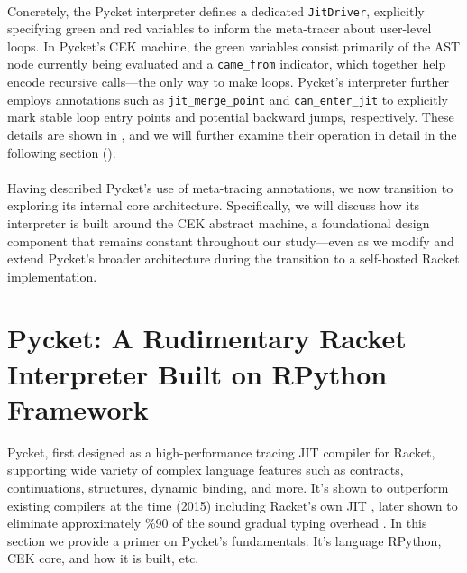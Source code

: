 
        \paragraph{}%
            Concretely, the Pycket interpreter defines a dedicated \texttt{JitDriver}, explicitly specifying green and red variables to inform the meta-tracer about user-level loops. In Pycket’s CEK machine, the green variables consist primarily of the AST node currently being evaluated and a \texttt{came\_from} indicator, which together help encode recursive calls—the only way to make loops. Pycket’s interpreter further employs annotations such as \texttt{jit\_merge\_point} and \texttt{can\_enter\_jit} to explicitly mark stable loop entry points and potential backward jumps, respectively. These details are shown in , and we will further examine their operation in detail in the following section ().

        \paragraph{}%
            Having described Pycket’s use of meta-tracing annotations, we now transition to exploring its internal core architecture. Specifically, we will discuss how its interpreter is built around the CEK abstract machine, a foundational design component that remains constant throughout our study—even as we modify and extend Pycket’s broader architecture during the transition to a self-hosted Racket implementation.

    \section[\texorpdfstring{Pycket: A Rudimentary Racket Interpreter Built on RPython Framework}{Pycket Primer}]{Pycket: A Rudimentary Racket Interpreter Built on RPython Framework}
        \label{section:pycket-primer}

        \begin{paragraph-here}
            Pycket, first designed as a high-performance tracing JIT compiler for Racket, supporting wide variety of complex language features such as contracts, continuations, structures, dynamic binding, and more. It's shown to outperform existing compilers at the time (2015) including Racket's own JIT \cite{pycketmain}, later shown to eliminate approximately \%90 of the sound gradual typing overhead \cite{pycketmain2}. In this section we provide a primer on Pycket's fundamentals. It's language RPython, CEK core, and how it is built, etc.
        \end{paragraph-here}

